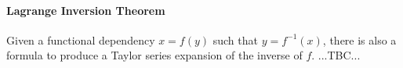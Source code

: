 







\paragraph{Lagrange Inversion Theorem}
Given a functional dependency $x = f(y)$ such that $y = f^{-1}(x)$, there is also a formula to produce a Taylor series expansion of the inverse of $f$. ...TBC...

%

% 



